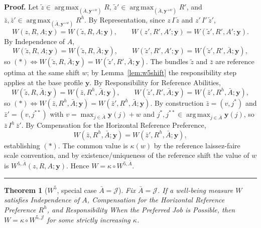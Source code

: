 \documentclass[12pt,thmsb]{article}
\DeclareMathOperator*{\argmax}{arg\,max}
\newtheorem{theorem}{Theorem}
\newenvironment{proof}[1][Proof]{\noindent \textbf{#1.} }{\  \rule{0.5em}{0.5em}}
\begin{document}
\begin{proof}
Let $\tilde z\in\argmax_{(\bar A,\mathbf y^{+w})}R$,
$\tilde z'\in\argmax_{(\bar A,\mathbf y^{+w})}R'$, and
$\bar z,\bar z'\in\argmax_{(\bar A,\mathbf y^{+w})}R^h$. By Representation, since
$z\,I\,\tilde z$ and $z'\,I'\,\tilde z'$,
\begin{equation*}
W(z,R,A;\mathbf y)=W(\tilde z,R,A;\mathbf y),\qquad
W(z',R',A';\mathbf y)=W(\tilde z',R',A';\mathbf y).
\end{equation*}
By Independence of $A$,
\begin{equation*}
W(\tilde z,R,A;\mathbf y)=W(\tilde z,R,\bar A;\mathbf y),\qquad
W(\tilde z',R',A';\mathbf y)=W(\tilde z',R',\bar A;\mathbf y),
\end{equation*}
so $(*)\Leftrightarrow W(\tilde z,R,\bar A;\mathbf y)=W(\tilde z',R',\bar
A;\mathbf y)$. The bundles $\tilde z$ and $\bar z$ are reference optima at the
same shift $w$; by Lemma~\ref{lem:w5shift} the responsibility step applies at
the base profile $\mathbf y$. By Responsibility for Reference Abilities,
\begin{equation*}
W(\tilde z,R,\bar A;\mathbf y)=W(\bar z,R^h,\bar A;\mathbf y),\qquad
W(\tilde z',R',\bar A;\mathbf y)=W(\bar z',R^h,\bar A;\mathbf y),
\end{equation*}
so $(*)\Leftrightarrow W(\bar z,R^h,\bar A;\mathbf y)=W(\bar z',R^h,\bar
A;\mathbf y)$. By construction $\bar z=(v,j^*)$ and $\bar z'=(v,j^{**})$ with
$v=\max_{j\in\bar A}\mathbf y(j)+w$ and
$j^*,j^{**}\in\argmax_{j\in\bar A}\mathbf y(j)$, so $\bar z\,I^h\,\bar z'$. By
Compensation for the Horizontal Reference Preference,
\begin{equation*}
W(\bar z,R^h,\bar A;\mathbf y)=W(\bar z',R^h,\bar A;\mathbf y),
\end{equation*}
establishing $(*)$. The common value is $\kappa(w)$ by the reference
laissez-faire scale convention, and by existence/uniqueness of the reference
shift the value of $w$ is $W^{5,\bar A}(z,R,A;\mathbf y)$. Hence
$W=\kappa\circ W^{5,\bar A}$.
\end{proof}

\begin{theorem}[$W^5$, special case $\bar A=\mathcal J$]
\label{thm:w5special}
Fix $\bar A=\mathcal J$. If a well-being measure $W$ satisfies Independence of
$A$, Compensation for the Horizontal Reference Preference $R^h$, and
Responsibility When the Preferred Job is Possible, then
$W=\kappa\circ W^{5,\mathcal J}$ for some strictly increasing $\kappa$.
\end{theorem}
\end{document}
